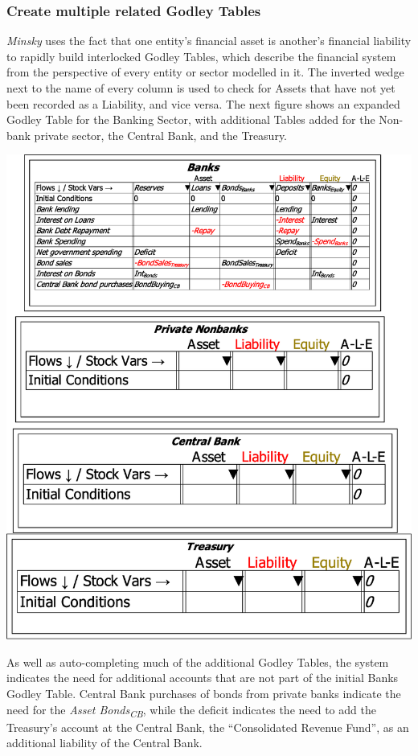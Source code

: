 \subsubsection{Create multiple related Godley Tables}

\emph{Minsky} uses the fact that one entity's financial asset is another's
financial liability to rapidly build interlocked Godley Tables, which
describe the financial system from the perspective of every entity
or sector modelled in it. The inverted wedge 
next to the name of every column is used to check for Assets that
have not yet been recorded as a Liability, and vice versa. The next
figure shows an expanded Godley Table for the Banking Sector, with
additional Tables added for the Non-bank private sector, the Central
Bank, and the Treasury.

\noindent\includegraphics[width=\textwidth]{images/GodleyTableImagesMultiTablesUnfinished}

As well as auto-completing much of the additional Godley Tables, the
system indicates the need for additional accounts that are not part
of the initial Banks Godley Table. Central Bank purchases of bonds
from private banks indicate the need for the \emph{Asset Bonds}\textsubscript{\emph{CB}},
while the deficit indicates the need to add the Treasury's account
at the Central Bank, the ``Consolidated Revenue Fund'', as an additional
liability of the Central Bank.

